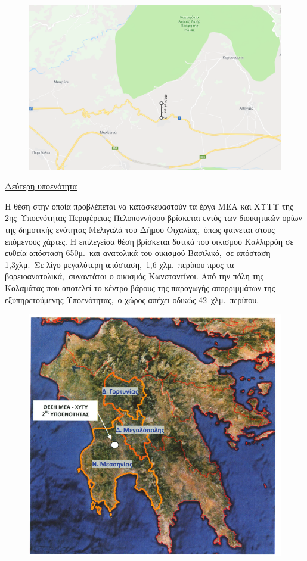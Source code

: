 \documentclass[12pt]{article}
\begin{document}
	\begin{figure} [H]
		\begin{center}
			\includegraphics [scale = 0.40] {map2.png}
		\end{center}
	\end{figure}

	\underline{Δεύτερη υποενότητα}
	
	Η θέση στην οποία προβλέπεται να κατασκευαστούν τα έργα ΜΕΑ και ΧΥΤΥ της 2ης Υποενότητας Περιφέρειας Πελοποννήσου βρίσκεται εντός των διοικητικών ορίων της δημοτικής ενότητας Μελιγαλά του Δήμου Οιχαλίας, όπως φαίνεται στους επόμενους χάρτες. Η επιλεγείσα θέση βρίσκεται δυτικά του οικισμού Καλλιρρόη σε ευθεία απόσταση 650μ. και ανατολικά του οικισμού Βασιλικό, σε απόσταση 1,3χλμ. Σε λίγο μεγαλύτερη απόσταση, 1,6 χλμ. περίπου προς τα βορειοανατολικά, συναντάται ο οικισμός Κωνσταντίνοι. Από την πόλη της Καλαμάτας που αποτελεί το κέντρο βάρους της παραγωγής απορριμμάτων της εξυπηρετούμενης Υποενότητας, ο χώρος απέχει οδικώς 42 χλμ. περίπου.
	
	\begin{figure} [H]
		\begin{center}
			\includegraphics [scale = 0.40] {map3.png}
		\end{center}
	\end{figure}
\end{document}

